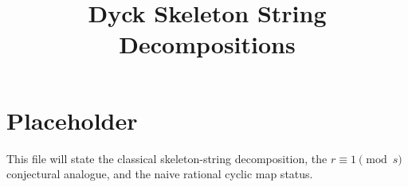 \documentclass{article}
\title{Dyck Skeleton String Decompositions}
\author{}
\date{}
\begin{document}
\maketitle

\section{Placeholder}

This file will state the classical skeleton-string decomposition, the
\(r\equiv 1 \pmod s\) conjectural analogue, and the naive rational cyclic map
status.
\end{document}

